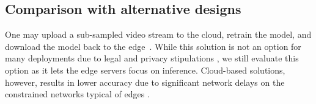 







\subsection{Comparison with alternative designs}
\label{subsec:eval-alternate}

One may upload a sub-sampled video stream to the cloud, retrain the model, and download the model back to the edge~\cite{khani2020real}. %
While this solution is not an option for many deployments due to legal and privacy stipulations \cite{sweden-data, azure-data}, we still evaluate this option as it lets the edge servers focus on inference. Cloud-based solutions, however, results in lower accuracy due to significant network delays %
on the constrained networks typical of edges \cite{getmobile}.

